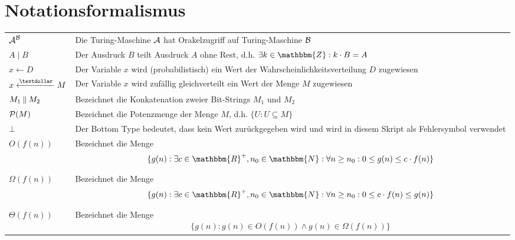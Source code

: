 \section{Notationsformalismus}
\begin{tabularx}{\textwidth}{ p{} | X }
	$\mathcal{A}^{\mathcal{B}}$ & Die Turing-Maschine $\mathcal{A}$ hat Orakelzugriff auf Turing-Maschine $\mathcal{B}$\\
	$A \mid B$ & Der Ausdruck $B$ teilt Ausdruck $A$ ohne Rest, d.h. $\exists k \in \mathbbm{Z} : k \cdot B = A$\\
	$x \leftarrow D$ & Der Variable $x$ wird (probabilistisch) ein Wert der Wahrscheinlichkeitsverteilung $D$ zugewiesen\\
	$x \randUnif M$ & Der Variable $x$ wird zufällig gleichverteilt ein Wert der Menge $M$ zugewiesen\\
	$M_1 \mathbin{\|} M_2$ & Bezeichnet die Konkatenation zweier Bit-Strings $M_1$ und $M_2$\\
	$\mathcal{P}(M)$ & Bezeichnet die Potenzmenge der Menge $M$, d.h. $\{U : U \subseteq M\}$\\
	$\bot$ & Der Bottom Type bedeutet, dass kein Wert zurückgegeben wird und wird in diesem Skript als Fehlersymbol verwendet\\
	$O(f(n))$ & Bezeichnet die Menge
	\begin{align*}
		\{g(n) : \exists c \in \mathbbm{R}^{+}, n_0 \in \mathbbm{N} : \forall n \geq n_0 : 0 \leq g(n) \leq c \cdot f(n)\}
	\end{align*}\\
	$\Omega(f(n))$ & Bezeichnet die Menge
	\begin{align*}
		\{g(n) : \exists c \in \mathbbm{R}^{+}, n_0 \in \mathbbm{N} : \forall n \geq n_0 : 0 \leq c \cdot f(n) \leq g(n)\}
	\end{align*}\\
	$\Theta(f(n))$ & Bezeichnet die Menge
	\begin{align*}
		\{g(n) : g(n) \in O(f(n)) \land g(n) \in \Omega(f(n))\}
	\end{align*}\\
\end{tabularx}

